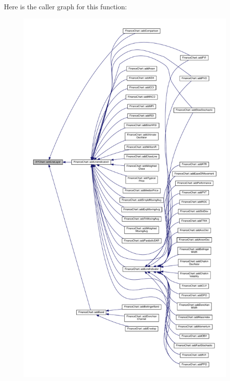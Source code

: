 Here is the caller graph for this function\+:
\nopagebreak
\begin{figure}[H]
\begin{center}
\leavevmode
\includegraphics[height=550pt]{class_x_y_chart_aea36113ca810376bd55e2d836b0fe7e5_icgraph}
\end{center}
\end{figure}
\mbox{\label{class_x_y_chart_a7071e482b072e63f9e9004b4d27f39fe}} 
